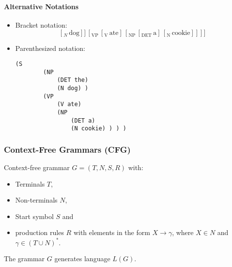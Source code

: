 \documentclass[a4paper, 11pt, accentcolor = tud3b]{tudreport}
\begin{document}
                    \paragraph{Alternative Notations} %
                        \begin{itemize}
                        	\item Bracket notation:
                        		\begin{equation*}
	                        		[_\text{S} \, [_\text{NP} \, [_\text{DET} \, \text{the}] \, [_N \, \text{dog} ]] \, [_\text{VP} \, [_\text{V} \, \text{ate} ] \, [_\text{NP} \, [_\text{DET} \, \text{a}] \, [_\text{N} \, \text{cookie} ]]]]
                        		\end{equation*}
                        	\item Parenthesized notation:
                        		\begin{lstlisting}[numbers = none]
	(S
		(NP
			(DET the)
			(N dog) )
		(VP
			(V ate)
			(NP
				(DET a)
				(N cookie) ) ) )
                        		\end{lstlisting}
                        \end{itemize}

                \subsubsection{Context-Free Grammars (CFG)} %
                	Context-free grammar \( G = (T, N, S, R) \) with:
                    \begin{itemize}
                    	\item Terminals \(T\),
                    	\item Non-terminals \(N\),
                    	\item Start symbol \(S\) and
                    	\item production rules \(R\) with elements in the form \( X \rightarrow \gamma \), where \( X \in N \) and \( \gamma \in (T \cup N)^* \).
                    \end{itemize}
                	The grammar \(G\) generates language \(L(G)\).
\end{document}
